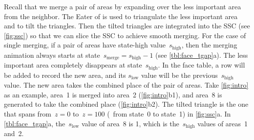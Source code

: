 \documentclass[twocolumn]{svjour3}          %
\begin{document}
Recall that we merge a pair of areas by expanding over 
the less important area from the neighbor.
The Eater of \citet{Suba2014Merge} is used to 
triangulate the less important area and to tilt the triangles.
Then the tilted triangles are integrated into the SSC
(see \fig\ref{fig:ssc})
so that we can slice the SSC to achieve smooth merging.
For the case of single merging,
if a pair of areas have state-high value~$s_\mathrm{high}$,
then the merging animation 
always starts at state~$s_\mathrm{merge}=s_\mathrm{high}-1$
(see \tabl\ref{tbl:face_tgap}a).
The less important area completely disappears
at state~$s_\mathrm{high}$.
In the face table, a row will be added to record the new area, 
and its $s_\mathrm{low}$ value 
will be the previous~$s_\mathrm{high}$ value.
The new area takes the combined place of the pair of areas.
Take \fig\ref{fig:intro} as an example, 
area~1 is merged into area~2 (\fig\ref{fig:intro}b1), 
and area~8 is generated to take the combined place (\fig\ref{fig:intro}b2).
The tilted triangle is the one that spans 
from~$z= 0$ to~$z=100$ (\ie~from state~0 to state~1)
in \fig\ref{fig:ssc}a.
In \tabl\ref{tbl:face_tgap}a, 
the~$s_\mathrm{low}$ value of area~8 is 1,
which is the~$s_\mathrm{high}$ values of areas~1 and~2.
\end{document}
